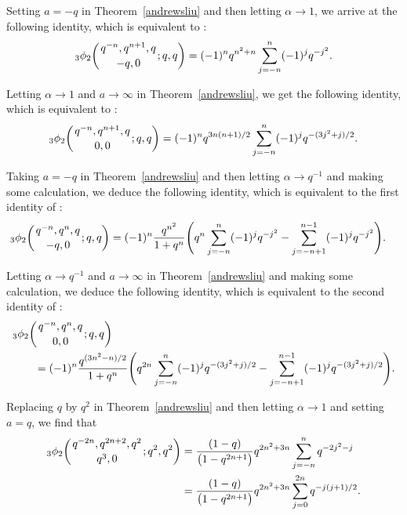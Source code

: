 \documentclass[10pt,a4paper]{amsart}
\numberwithin{equation}{section}
\begin{document}
Setting $a=-q$ in Theorem~\ref{andrewsliu} and then letting $\alpha \to 1$, we arrive at the following identity, which is equivalent to
\cite[equation~(6.1)]{Liu2013RamanJ}:
\begin{equation}\label{spvalue:eqn3}
{_3\phi_2}\biggl({{q^{-n}, q^{n+1},q}\atop{-q, 0}}; q, q\biggr)
=(-1)^n q^{n^2+n}\sum_{j=-n}^n (-1)^j q^{-j^2}.
\end{equation}

Letting $\alpha \to 1$ and $a \to \infty$ in Theorem~\ref{andrewsliu}, we get the following identity, which is equivalent to \cite[equation~(6.2)]{Liu2013RamanJ}:
\begin{equation*}%
	{_3\phi_2}\biggl({{q^{-n}, q^{n+1},q}\atop{0, 0}}; q, q\biggr)
	=(-1)^n q^{3n(n+1)/2}\sum_{j=-n}^n (-1)^j q^{-{(3j^2+j)/2}}.
\end{equation*}

Taking $a=-q$ in Theorem~\ref{andrewsliu} and then letting $\alpha \to q^{-1}$ and making some calculation, we deduce the following identity, which is equivalent to the first identity of \cite[Lemma~6.1]{Liu2013RamanJ}:
\begin{align}\label{spvalue:eqn5}
	&{_3\phi_2}\biggl({{q^{-n}, q^{n},q}\atop{-q, 0}}; q, q\biggr)
=(-1)^n\frac{q^{n^2}}{1+q^n} \Biggl(q^n \sum_{j=-n}^n (-1)^j q^{-j^2}-\sum_{j={-n+1}}^{n-1} (-1)^j q^{-j^2}\Biggr).
\end{align}

Letting $\alpha \to q^{-1}$ and $a \to \infty$ in Theorem~\ref{andrewsliu} and making some calculation, we deduce the following identity, which is equivalent to the second identity of \cite[Lemma~6.1]{Liu2013RamanJ}:
\begin{align}
	&{_3\phi_2}\biggl({{q^{-n}, q^{n},q}\atop{0, 0}}; q, q\biggr)\nonumber\\
	&\qquad{}=(-1)^n\frac{q^{(3n^2-n)/2}}{1+q^n} \Biggl({ q^{2n}} \sum_{j=-n}^n (-1)^j q^{-(3j^2+j)/2}-\sum_{j={-n+1}}^{n-1} (-1)^j q^{-(3j^2+j)/2}\Biggr).\label{spvalue:eqn6}
\end{align}



Replacing $q$ by $q^2$ in Theorem~\ref{andrewsliu} and then letting $\alpha \to 1$ and setting $a=q$, we find that
\begin{align}
{_3\phi_2}\biggl({{q^{-2n}, q^{2n+2},q^2}\atop{q^3, 0}}; q^2, q^2\biggr)
&{}=\frac{(1-q)}{\bigl(1-q^{2n+1}\bigr)} q^{2n^2+3n}\sum_{j=-n}^{n} q^{-2j^2-j}	\nonumber\\
&{}={ \frac{(1-q)}{\bigl(1-q^{2n+1}\bigr)} q^{2n^2+3n}\sum_{j=0}^{2n} q^{-j(j+1)/2}.}\label{spvalue:eqn7}
\end{align}	
\end{document}
